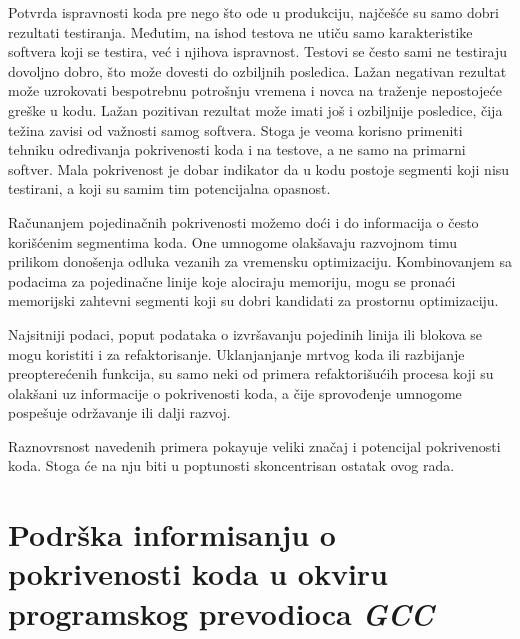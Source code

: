 \documentclass[12pt,oneside]{memoir}
\newcommand{\strano}[1]{\textit{#1}}
\begin{document}
Potvrda ispravnosti koda pre nego što ode u produkciju, najčešće su samo dobri rezultati testiranja. Međutim, na ishod testova ne utiču samo karakteristike softvera koji se testira, već i njihova ispravnost. Testovi se često sami ne testiraju dovoljno dobro, što može dovesti do ozbiljnih posledica. Lažan negativan rezultat može uzrokovati bespotrebnu potrošnju vremena i novca na traženje nepostojeće greške u kodu. Lažan pozitivan rezultat može imati još i ozbiljnije posledice, čija težina zavisi od važnosti samog softvera. Stoga je veoma korisno primeniti tehniku određivanja pokrivenosti koda i na testove, a ne samo na primarni softver. Mala pokrivenost je dobar indikator da u kodu postoje segmenti koji nisu testirani, a koji su samim tim potencijalna opasnost. 

Računanjem pojedinačnih pokrivenosti možemo doći i do informacija o često korišćenim segmentima koda. One umnogome olakšavaju razvojnom timu prilikom donošenja odluka vezanih za vremensku optimizaciju. Kombinovanjem sa podacima za pojedinačne linije koje alociraju memoriju, mogu se pronaći memorijski zahtevni segmenti koji su dobri kandidati za prostornu optimizaciju.

Najsitniji podaci, poput podataka o izvršavanju pojedinih linija ili blokova se mogu koristiti i za refaktorisanje. Uklanjanjanje mrtvog koda ili razbijanje preopterećenih funkcija, su samo neki od primera refaktorišućih procesa koji su olakšani uz informacije o pokrivenosti koda, a čije sprovođenje umnogome pospešuje održavanje ili dalji razvoj.

Raznovrsnost navedenih primera pokayuje veliki značaj i potencijal pokrivenosti koda. Stoga će na nju biti u poptunosti skoncentrisan ostatak ovog rada. 


\chapter{Podrška informisanju o pokrivenosti koda u okviru programskog prevodioca \strano{GCC}}
\label{chp:ideja}
\end{document}
